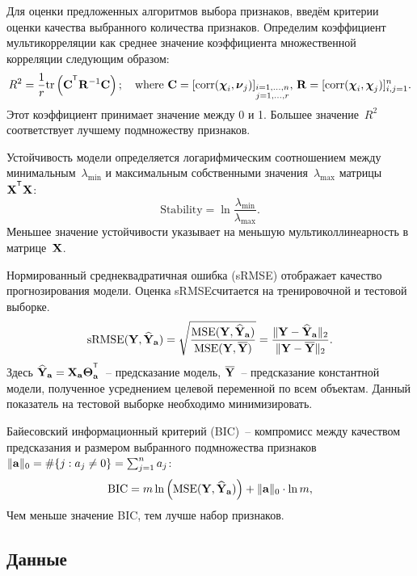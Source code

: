 Для оценки предложенных алгоритмов выбора признаков, введём критерии оценки качества выбранного количества признаков.
Определим коэффициент мультикорреляции как среднее значение коэффициента множественной корреляции следующим образом:
\begin{equation*}
R^2 = \frac{1}{r} \text{tr} \left( \bC^{\T} \mathbf{R}^{-1} \bC \right); \quad \text{where }\bC = [ \text{corr}(\bchi_i, \bnu_j)]_{\substack{i=1, \dots, n \\ j=1, \dots, r}}, \, \mathbf{R} = [ \text{corr}(\bchi_i, \bchi_j)]_{i, j = 1}^n.
\end{equation*}
Этот коэффициент принимает значение между 0 и 1. Большее значение~$R^2$ соответствует лучшему подмножеству признаков.

Устойчивость модели определяется логарифмическим соотношением между минимальным~$\lambda_{\min}$ и максимальным собственными значения~$\lambda_{\max}$ матрицы~$\bX^{\T} \bX$:
\begin{equation*}
\text{Stability} = \ln \frac{\lambda_{\min}}{\lambda_{\max}}.
\end{equation*}
Меньшее значение устойчивости указывает на меньшую мультиколлинеарность в матрице~$\mathbf{X}$.

Нормированный среднеквадратичная ошибка (sRMSE) отображает качество прогнозирования модели. Оценка sRMSEсчитается на тренировочной и тестовой выборке.
\begin{equation*}
\text{sRMSE}(\mathbf{Y}, \widehat{\mathbf{Y}}_{\mathbf{a}}) = \sqrt{\frac{\text{MSE} (\mathbf{Y}, \widehat{\mathbf{Y}}_{\mathbf{a}})}{\text{MSE} (\mathbf{Y}, \overline{\mathbf{Y}})}} =  \frac{\| \mathbf{Y} - \widehat{\mathbf{Y}}_{\mathbf{a}} \|_2}{\| \mathbf{Y} - \overline{\mathbf{Y}} \|_2}.
\end{equation*}
Здесь $\widehat{\bY}_{\ba} = \bX_{\ba} \bTheta_{\ba}^{\T}$~-- предсказание модель, $\overline{\mathbf{Y}}$~-- предсказание константной модели, полученное усреднением целевой переменной по всем объектам.
Данный показатель на тестовой выборке необходимо минимизировать.

Байесовский информационный критерий (BIC)~-- компромисс между качеством предсказания и размером выбранного подмножества признаков~$\|\mathbf{a}\|_0 = \#\{j: a_j \neq 0\}= \sum_{j=1}^n a_j$:
\begin{equation*}
\text{BIC} = m \ln \left( \text{MSE} ( \mathbf{Y}, \widehat{\mathbf{Y}}_{\mathbf{a}})\right) + \| \mathbf{a} \|_0 \cdot \ln m,
\end{equation*}
Чем меньше значение BIC, тем лучше набор признаков.

\subsection{Данные}


